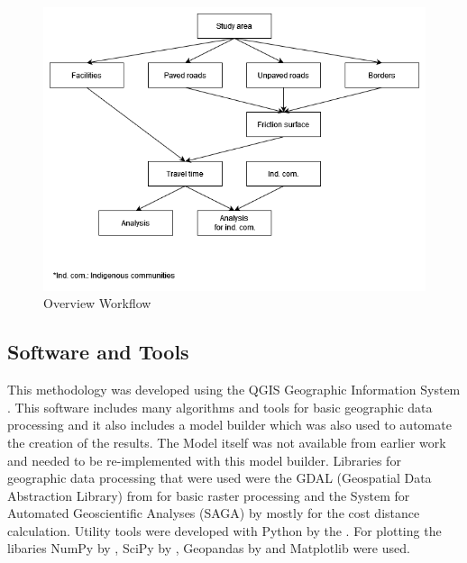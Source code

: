 \documentclass[11pt, a4paper]{report}
\begin{document}
\begin{figure}[H]
  \centering
  \includegraphics[width=0.9\linewidth]{figures/overviewworkflow.png}
  \caption{Overview Workflow}
  \label{fig:overviewworkflow}
\end{figure}

\subsection{Software and Tools}
This methodology was developed using the QGIS Geographic Information System \citet{qgis_development_team_qgis_2024}. This software includes many algorithms and tools for basic geographic data processing and it also includes a model builder which was also used to automate the creation of the results. The Model itself was not available from earlier work and needed to be re-implemented with this model builder. Libraries for geographic data processing that were used were the GDAL (Geospatial Data Abstraction Library) from \citet{rouault_gdal_2024} for basic raster processing and the System for Automated Geoscientific Analyses (SAGA) by \citet{conrad_system_2015} mostly for the cost distance calculation. Utility tools were developed with Python by the \citet{python_software_foundation_python_2024}. For plotting the libaries NumPy by \cite{harris_array_2020}, SciPy by \cite{virtanen_scipy_2020}, Geopandas by \cite{jordahl_geopandasgeopandas_2020} and Matplotlib \cite{hunter_matplotlib_2007} were used.
\end{document}
